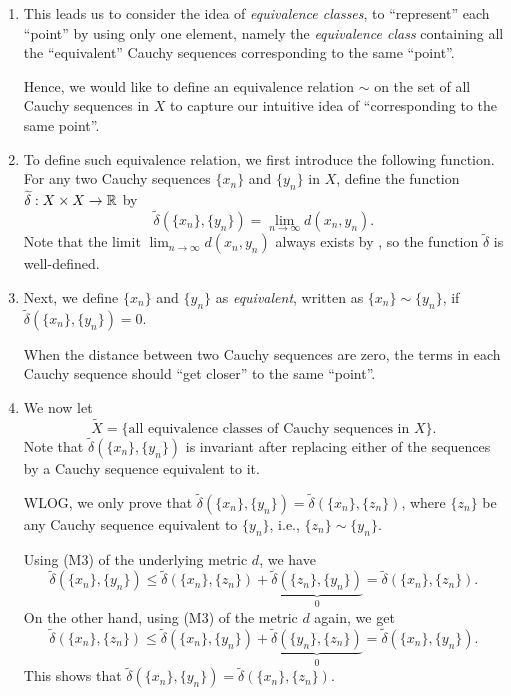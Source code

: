 \begin{enumerate}
\item This leads us to consider the idea of \emph{equivalence classes}, to
``represent'' each ``point'' by using only one element, namely the
\emph{equivalence class} containing all the ``equivalent'' Cauchy sequences
corresponding to the same ``point''.

Hence, we would like to define an equivalence relation \(\sim\) on the set of
all Cauchy sequences in \(X\) to capture our intuitive idea of ``corresponding
to the same point''.

\item To define such equivalence relation, we first introduce the following
function. For any two Cauchy sequences \(\{x_n\}\) and \(\{y_n\}\) in \(X\),
define the function
\(\widetilde{\delta}:X\times X\to\mathbb{R}\) by
\[\widetilde{\delta}(\{x_n\},\{y_n\})=\lim_{n\to \infty}d(x_n,y_n).\]
Note that the limit \(\lim_{n\to \infty}d(x_n,y_n)\) always exists by
, so the function \(\widetilde{\delta}\) is well-defined.

\item Next, we define \(\{x_n\}\) and \(\{y_n\}\) as \emph{equivalent}, written
as \(\{x_n\}\sim\{y_n\}\), if \(\widetilde{\delta}(\{x_n\},\{y_n\})=0\).

\begin{intuition} When the distance between two Cauchy sequences are zero, the
terms in each Cauchy sequence should ``get closer'' to the same ``point''.
\end{intuition}


\item We now let
\[
\widetilde{X}=\{\text{all equivalence classes of Cauchy sequences in \(X\)}\}.
\]
Note that \(\widetilde{\delta}(\{x_n\},\{y_n\})\) is invariant after replacing
either of the sequences by a Cauchy sequence equivalent to it.

\begin{pf}
WLOG, we only prove that
\(\widetilde{\delta}(\{x_n\},\{y_n\})=\widetilde{\delta}(\{x_n\},\{z_n\})\), where
\(\{z_n\}\) be any Cauchy sequence equivalent to \(\{y_n\}\), i.e.,
\(\{z_n\}\sim\{y_n\}\).

Using (M3) of the underlying metric \(d\), we have
\[
\widetilde{\delta}(\{x_n\},\{y_n\})\le
\widetilde{\delta}(\{x_n\},\{z_n\})+\underbrace{\widetilde{\delta}(\{z_n\},\{y_n\})}_{0}
=\widetilde{\delta}(\{x_n\},\{z_n\}).
\]
On the other hand, using (M3) of the metric \(d\) again, we get
\[
\widetilde{\delta}(\{x_n\},\{z_n\})\le
\widetilde{\delta}(\{x_n\},\{y_n\})+\underbrace{\widetilde{\delta}(\{y_n\},\{z_n\})}_{0}
=\widetilde{\delta}(\{x_n\},\{y_n\}).
\]
This shows that
\(\widetilde{\delta}(\{x_n\},\{y_n\})=\widetilde{\delta}(\{x_n\},\{z_n\})\).
\end{pf}


\end{enumerate}
